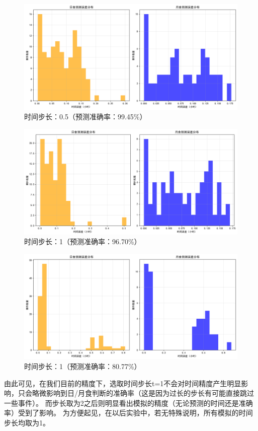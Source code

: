 \documentclass[hidelinks]{article}
\begin{document}
\begin{figure}[H]
    \centering
    \includegraphics[width=0.5\linewidth]{images/error_distribution_0.5.png}
    \caption{时间步长：0.5（预测准确率：99.45\%）}
    \label{fig:eclipse_error_0.5}
\end{figure}

\begin{figure}[H]
    \centering
    \includegraphics[width=0.5\linewidth]{images/error_distribution_1.png}
    \caption{时间步长：1（预测准确率：96.70\%）}
    \label{fig:eclipse_error_1}
\end{figure}

\begin{figure}[H]
    \centering
    \includegraphics[width=0.5\linewidth]{images/error_distribution_2.png}
    \caption{时间步长：1（预测准确率：80.77\%）}
    \label{fig:eclipse_error_2}
\end{figure}
由此可见，在我们目前的精度下，选取时间步长t=1不会对时间精度产生明显影响，只会略微影响到日/月食判断的准确率（这是因为过长的步长有可能直接跳过一些事件）。
而步长取为2之后则明显看出模拟的精度（无论预测的时间还是准确率）受到了影响。
为方便起见，在以后实验中，若无特殊说明，所有模拟的时间步长均取为1。\\
\end{document}
